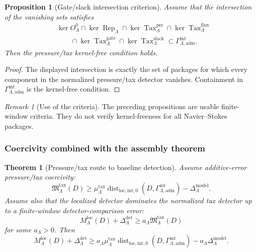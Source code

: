 \documentclass[11pt]{article}
\numberwithin{equation}{section}
\newtheorem{theorem}{Theorem}[section]
\newtheorem{proposition}[proposition]{Proposition}
\theoremstyle{definition}
\theoremstyle{remark}
\newtheorem{remark}[remark]{Remark}
\newcommand{\loc}{\mathrm{loc}}
\newcommand{\intg}{\mathrm{int}}
\newcommand{\adm}{\mathrm{adm}}
\newcommand{\prs}{\mathrm{prs}}
\newcommand{\Dist}{\operatorname{dist}}
\newcommand{\Gammaadm}{\Gamma^{\intg}_{\Lambda,\adm}}
\begin{document}
\begin{proposition}[Gate/slack intersection criterion]
\label{prop:gate-slack-intersection}
Assume that the intersection of the vanishing sets satisfies
\[
\begin{aligned}
    &\ker O^0_\Lambda
    \cap
    \ker\operatorname{Rep}_\Lambda
    \cap
    \ker\operatorname{Tax}^{\prs}_\Lambda
    \cap
    \ker\operatorname{Tax}^{\mathrm{flux}}_\Lambda
\\
    &\qquad\cap
    \ker\operatorname{Tax}^{\mathrm{gate}}_\Lambda
    \cap
    \ker\operatorname{Tax}^{\mathrm{slack}}_\Lambda
    \subset
    \Gammaadm .
\end{aligned}
\]
Then the pressure/tax kernel-free condition holds.
\end{proposition}

\begin{proof}
The displayed intersection is exactly the set of packages for which every
component in the normalized pressure/tax detector vanishes.  Containment in
\(\Gammaadm\) is the kernel-free condition.
\end{proof}

\begin{remark}[Use of the criteria]
The preceding propositions are usable finite-window criteria.  They do not
verify kernel-freeness for all Navier--Stokes packages.
\end{remark}

\subsubsection{Coercivity combined with the assembly theorem}

\begin{theorem}[Pressure/tax route to baseline detection]
\label{thm:pressure-tax-combined-with-assembly}
Assume additive-error pressure/tax coercivity:
\[
    \mathfrak M^{\mathrm{tax}}_\Lambda(D)
    \ge
    \mu^{\mathrm{tax}}_\Lambda
    \Dist_{\loc,\intg,0}(D,\Gammaadm)
    -
    \Delta^{\mathrm{model}}_\Lambda.
\]
Assume also that the localized detector dominates the normalized tax detector
up to a finite-window detector-comparison error:
\[
    M^{\loc}_\Lambda(D)
    +
    \Delta^{\mathrm{det}}_\Lambda
    \ge
    a_\Lambda
    \mathfrak M^{\mathrm{tax}}_\Lambda(D)
\]
for some \(a_\Lambda>0\).  Then
\[
    M^{\loc}_\Lambda(D)
    +
    \Delta^{\mathrm{det}}_\Lambda
    \ge
    a_\Lambda\mu^{\mathrm{tax}}_\Lambda
    \Dist_{\loc,\intg,0}(D,\Gammaadm)
    -
    a_\Lambda\Delta^{\mathrm{model}}_\Lambda.
\]
\end{theorem}
\end{document}
